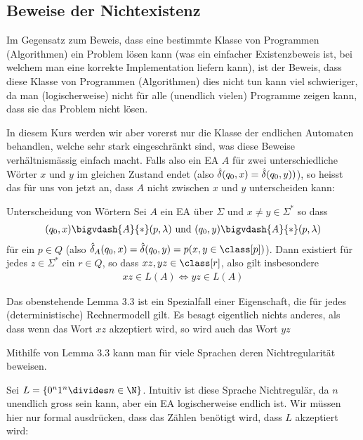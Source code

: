 \newpage
\subsection{Beweise der Nichtexistenz}
Im Gegensatz zum Beweis, dass eine bestimmte Klasse von Programmen (Algorithmen) ein Problem lösen kann
(was ein einfacher Existenzbeweis ist, bei welchem man eine korrekte Implementation liefern kann),
ist der Beweis, dass diese Klasse von Programmen (Algorithmen) dies nicht tun kann viel schwieriger,
da man (logischerweise) nicht für alle (unendlich vielen) Programme zeigen kann, dass sie das Problem nicht lösen.

In diesem Kurs werden wir aber vorerst nur die Klasse der endlichen Automaten behandlen, welche sehr stark eingeschränkt sind,
was diese Beweise verhältnismässig einfach macht.
Falls also ein EA $A$ für zwei unterschiedliche Wörter $x$ und $y$ im gleichen Zustand endet (also $\hat{\delta}(q_0, x) = \hat{\delta}(q_0, y))$),
so heisst das für uns von jetzt an, dass $A$ nicht zwischen $x$ und $y$ unterscheiden kann:

\begin{lemma}[]{Unterscheidung von Wörtern}
    Sei $A$ ein EA über $\Sigma$ und $x \neq y \in \Sigma^*$ so dass
    \begin{align*}
        (q_0, x) \bigvdash{A}{*} (p, \lambda) \text{ und } (q_0, y) \bigvdash{A}{*} (p, \lambda)
    \end{align*}
    für ein $p \in Q$ (also $\hdelta_A (q_0, x) = \hdelta(q_0, y) = p(x, y \in \class [p])$).
    Dann existiert für jedes $z \in \Sigma^*$ ein $r \in Q$, so dass $xz, yz \in \class[r]$, also gilt insbesondere
    \begin{align*}
        xz \in L(A) \Longleftrightarrow yz \in L(A)
    \end{align*}
\end{lemma}
Das obenstehende Lemma 3.3 ist ein Spezialfall einer Eigenschaft, die für jedes (deterministische) Rechnermodell gilt.
Es besagt eigentlich nichts anderes, als dass wenn das Wort $xz$ akzeptiert wird, so wird auch das Wort $yz$

Mithilfe von Lemma 3.3 kann man für viele Sprachen deren Nichtregularität beweisen.

\numberingOff
\inlineex Sei $L = \{ 0^n1^n \divides n \in \N \}$.
Intuitiv ist diese Sprache Nichtregulär, da $n$ unendlich gross sein kann, aber ein EA logischerweise endlich ist.
Wir müssen hier nur formal ausdrücken, dass das Zählen benötigt wird, dass $L$ akzeptiert wird:

